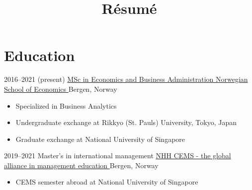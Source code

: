 \documentclass[10pt, letterpaper]{moderncv}
\title{Résumé}
\begin{document}

\makecvtitle
\vspace{-20pt}





\section{Education}
    \begin{samepage}
      \cventry
          {2016--2021 (present)}
          {\href{https://www.nhh.no/en/study-programmes/msc-in-economics-and-business-administration/business-analytics/}{%
             MSc in Economics and Business Administration%
}}
          {\href{https://nhh.no}{%
             Norwegian School of Economics%
}}
          {}
          {Bergen, Norway%
}
        {\begin{itemize}
             \item{Specialized in Business Analytics}
             \item{Undergraduate exchange at Rikkyo (St. Pauls) University, Tokyo, Japan}
             \item{Graduate exchange at National University of Singapore}
         \end{itemize}}
    \end{samepage}
    \begin{samepage}
      \cventry
          {2019--2021}
          {%
             Master's in international management%
}
          {\href{https://www.nhh.no/en/for-students/international-opportunities/cems-mim/}{%
             NHH CEMS - the global alliance in management education%
}}
          {}
          {Bergen, Norway%
}
        {\begin{itemize}
             \item{CEMS semester abroad at National University of Singapore}
         \end{itemize}}
    \end{samepage}
\end{document}
